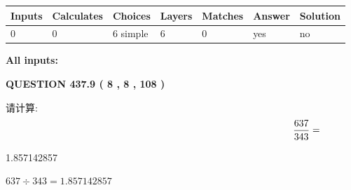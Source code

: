 \documentclass{ctexart}
\begin{document}
 
\noindent{}
 
 
   
   
   
   
\noindent\begin{tabular}{|l|l|l|l|l|l|l|}
 \hline
Inputs & Calculates & Choices & Layers & Matches & Answer & Solution \\ \hline
 0  & 
 0  & 
 6
  simple  
  & 
 6  & 
 0  & 
  yes & 
  no 
  \\ \hline
 \end{tabular}
   
   
   
   
\noindent{}
   
   
   
   
\noindent\vspace{0.1in}\hspace{-0.08in} {\textbf{\Large{All inputs: }}}
   
   
  
\vspace{0.2in}
  
{\textbf{\Large{QUESTION
437.9 
 ( 8 , 8 , 108 )
}}}
  
  
 
请计算:
\begin{equation}
\frac { %
637 }  {  %
343} = \nonumber
\end{equation}
 
 
 
\noindent{}
 
 

1.857142857
 
 
\noindent{}
 
 

 
 
 
\noindent{}
 
 

$ %
637 \div  %
343=   %
1.857142857$
 
 
\noindent{}
 
 

 
   
\end{document}

